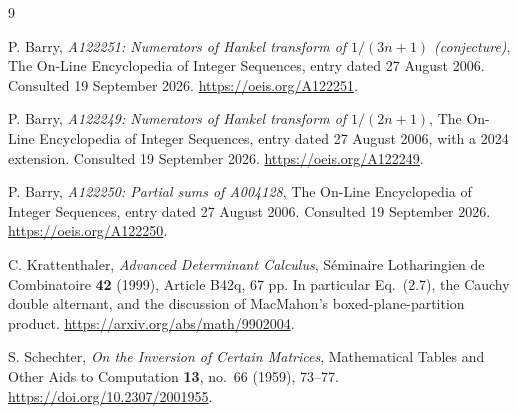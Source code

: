 \documentclass[11pt,a4paper]{article}
\numberwithin{equation}{section}
\theoremstyle{definition}
\theoremstyle{remark}
\begin{document}
\begin{thebibliography}{9}
P. Barry, \emph{A122251: Numerators of Hankel transform of $1/(3n+1)$ (conjecture)}, The On-Line Encyclopedia of Integer Sequences, entry dated 27 August 2006. Consulted 19 September 2026. \url{https://oeis.org/A122251}.

P. Barry, \emph{A122249: Numerators of Hankel transform of $1/(2n+1)$}, The On-Line Encyclopedia of Integer Sequences, entry dated 27 August 2006, with a 2024 extension. Consulted 19 September 2026. \url{https://oeis.org/A122249}.

P. Barry, \emph{A122250: Partial sums of A004128}, The On-Line Encyclopedia of Integer Sequences, entry dated 27 August 2006. Consulted 19 September 2026. \url{https://oeis.org/A122250}.

C. Krattenthaler, \emph{Advanced Determinant Calculus}, S\'eminaire Lotharingien de Combinatoire \textbf{42} (1999), Article B42q, 67 pp. In particular Eq.~(2.7), the Cauchy double alternant, and the discussion of MacMahon's boxed-plane-partition product. \url{https://arxiv.org/abs/math/9902004}.

S. Schechter, \emph{On the Inversion of Certain Matrices}, Mathematical Tables and Other Aids to Computation \textbf{13}, no.~66 (1959), 73--77. \url{https://doi.org/10.2307/2001955}.
\end{thebibliography}
\end{document}

